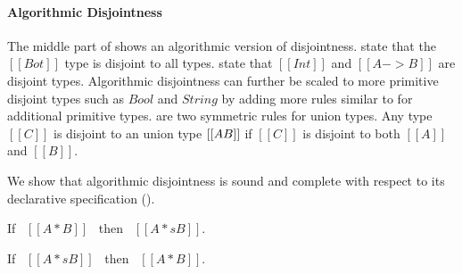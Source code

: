 \paragraph{Algorithmic Disjointness}
The middle part of  shows an algorithmic
version of disjointness.   state that the $[[Bot]]$
type is disjoint to all types.   state that
$[[Int]]$ and $[[A -> B]]$ are disjoint types.  Algorithmic
disjointness can further be scaled to more primitive disjoint types
such as $Bool$ and $String$ by adding more rules similar to
 for additional primitive types.
 are two symmetric rules for union types. Any type $[[C]]$ is
disjoint to an union type $[[A \/ B]]$ if $[[C]]$ is disjoint to both
$[[A]]$ and $[[B]]$.

We show that algorithmic disjointness is sound and complete
with respect to its declarative specification ().

\begin{lemma}
  If \ $[[A * B]]$ \ then \ $[[A *s B]]$.
\label{lemma:union:disj-sound}
\end{lemma}

\begin{comment}
\begin{proof}
  By induction on algorithmic disjointness relation.
  \begin{itemize}
    \item Cases \rref{ad-btmr, ad-btml, ad-orl, ad-orr} require induction on hypothesis
          and \Cref{lemma:union:sub-or}.
    \item Cases \rref{ad-intl, ad-intr} require induction on type and \Cref{lemma:union:sub-or}.
  \end{itemize}
\end{proof}
\end{comment}

\begin{lemma}
  If \ $[[A *s B]]$ \ then \ $[[A * B]]$.
\label{lemma:union:disj-complete}
\end{lemma}

\begin{comment}
\begin{proof}
  By induction on type A.
  \begin{itemize}
    \item Case $[[Top]]$ requires \Cref{lemma:union:bl-disj}.
    \item Case $[[Bot]]$ is trivial to prove.
    \item Case $[[Int]]$ requires induction on type B and
          \Cref{lemma:union:bl-disj,lemma:union:disj-sym}.
    \item Case $[[A -> B]]$ requires induction on type B and \Cref{lemma:union:disj-sym}.
    \item Case $[[A \/ B]]$ follows directly from inductive hypothesis.
  \end{itemize}
\end{proof}
\end{comment}

